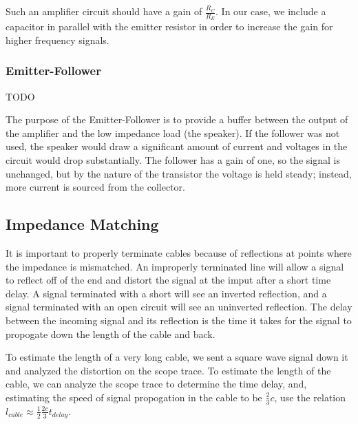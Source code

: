 \documentclass[12pt]{article}
\begin{document}
Such an amplifier circuit should have a gain of $\frac{R_C}{R_E}$. In our case, we include a capacitor in parallel with the emitter resistor in order to increase the gain for higher frequency signals.

\subsubsection*{Emitter-Follower}
TODO

The purpose of the Emitter-Follower is to provide a buffer between the output of the amplifier and the low impedance load (the speaker). If the follower was not used, the speaker would draw a significant amount of current and voltages in the circuit would drop substantially. The follower has a gain of one, so the signal is unchanged, but by the nature of the transistor the voltage is held steady; instead, more current is sourced from the collector.

\subsection*{Impedance Matching}
It is important to properly terminate cables because of reflections at points where the impedance is mismatched. An improperly terminated line will allow a signal to reflect off of the end and distort the signal at the imput after a short time delay. A signal terminated with a short will see an inverted reflection, and a signal terminated with an open circuit will see an uninverted reflection. The delay between the incoming signal and its reflection is the time it takes for the signal to propogate down the length of the cable and back.

To estimate the length of a very long cable, we sent a square wave signal down it and analyzed the distortion on the scope trace. To estimate the length of the cable, we can analyze the scope trace to determine the time delay, and, estimating the speed of signal propogation in the cable to be $\frac{2}{3}c$, use the relation $l_{cable} \approx \frac{1}{2} \frac{2c}{3} t_{delay}$.
\end{document}
